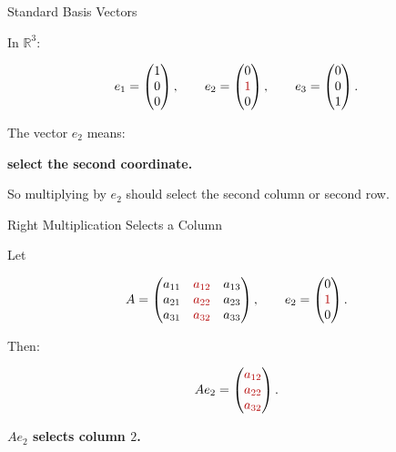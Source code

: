 \documentclass[10pt]{beamer}
\theoremstyle{definition}
\newcommand{\x}[1]{\alert{\textbf{#1}}}
\newcommand{\rd}[1]{{\color{red!70!black}#1}}
\begin{document}
\begin{frame}{Standard Basis Vectors}

In $\mathbb R^3$:

$$
e_1=\begin{pmatrix}1\\0\\0\end{pmatrix},
\qquad
e_2=\begin{pmatrix}0\\\rd{1}\\0\end{pmatrix},
\qquad
e_3=\begin{pmatrix}0\\0\\1\end{pmatrix}.
$$

\vfill

The vector $e_2$ means:

\begin{center}
\x{select the second coordinate.}
\end{center}

\vfill

So multiplying by $e_2$ should select the second column or second row.

\end{frame}


\begin{frame}{Right Multiplication Selects a Column}

Let

$$
A=
\begin{pmatrix}
a_{11}&\rd{a_{12}}&a_{13}\\
a_{21}&\rd{a_{22}}&a_{23}\\
a_{31}&\rd{a_{32}}&a_{33}
\end{pmatrix},
\qquad
e_2=\begin{pmatrix}0\\\rd{1}\\0\end{pmatrix}.
$$

\vfill

Then:

$$
Ae_2=
\begin{pmatrix}
\rd{a_{12}}\\
\rd{a_{22}}\\
\rd{a_{32}}
\end{pmatrix}.
$$

\vfill

\begin{center}
\x{$Ae_2$ selects column $2$.}
\end{center}

\end{frame}
\end{document}
